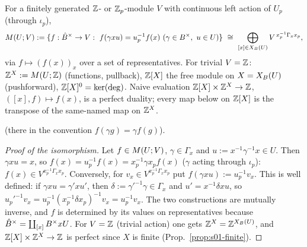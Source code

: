\begin{definition}\label{def:s01-brandt}
For a finitely generated $\mathbb{Z}$- or $\mathbb{Z}_p$-module $V$ with continuous left action of $U_p$ (through $\iota_p$),
\[\Brandt{U}{V}:=\{f:\Bhat^\times\to V:\ f(\gamma xu)=u_p^{-1}f(x)\ (\gamma\in B^\times,\ u\in U)\}\ \cong\ \bigoplus_{[x]\in\XB{U}}V^{\,x_p^{-1}\Gamma_xx_p},\]
via $f\mapsto(f(x))_x$ over a set of representatives. For trivial $V=\mathbb{Z}$: $\mathbb{Z}^X:=M(U;\mathbb{Z})$ (functions, pullback),
$\mathbb{Z}[X]$ the free module on $X=X_B(U)$ (pushforward), $\mathbb{Z}[X]^0=\ker(\deg)$. Naive evaluation $\mathbb{Z}[X]\times\mathbb{Z}^X\to\mathbb{Z}$,
$([x],f)\mapsto f(x)$, is a perfect duality; every map below on $\mathbb{Z}[X]$ is the transpose of the same-named map on $\mathbb{Z}^X$.
\end{definition}
\noindent\stknown{}  (there in the
convention $f(\gamma g)=\gamma f(g)$).
\begin{proof}[Proof of the isomorphism]
Let $f\in M(U;V)$, $\gamma\in\Gamma_x$ and $u:=x^{-1}\gamma^{-1}x\in U$. Then $\gamma xu=x$, so $f(x)=u_p^{-1}f(x)=x_p^{-1}\gamma x_pf(x)$
($\gamma$ acting through $\iota_p$): $f(x)\in V^{x_p^{-1}\Gamma_xx_p}$. Conversely, for $v_x\in V^{x_p^{-1}\Gamma_xx_p}$ put $f(\gamma xu):=u_p^{-1}v_x$.
This is well defined: if $\gamma xu=\gamma'xu'$, then $\delta:=\gamma'^{-1}\gamma\in\Gamma_x$ and $u'=x^{-1}\delta xu$, so
$u_p'^{-1}v_x=u_p^{-1}(x_p^{-1}\delta x_p)^{-1}v_x=u_p^{-1}v_x$. The two constructions are mutually inverse, and $f$ is determined by its
values on representatives because $\hat{B}^\times=\coprod_{[x]}B^\times xU$. For $V=\mathbb{Z}$ (trivial action) one gets $\mathbb{Z}^X=\mathbb{Z}^{X_B(U)}$, and $\mathbb{Z}[X]\times\mathbb{Z}^X\to\mathbb{Z}$ is
perfect since $X$ is finite (Prop.~\ref{prop:s01-finite}). \stproved{}
\end{proof}


